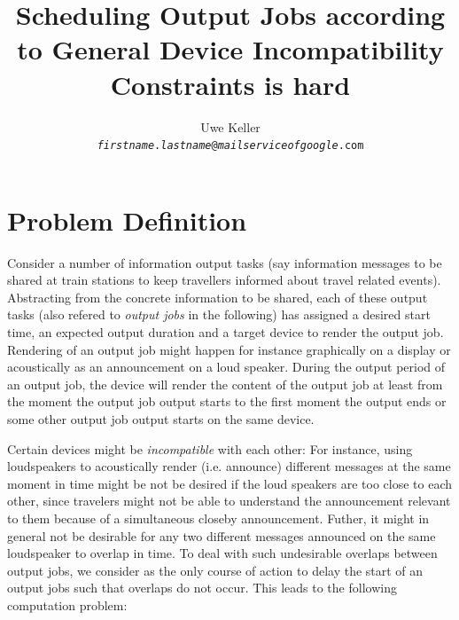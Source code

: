 \documentclass{article}
\title{Scheduling Output Jobs according to General Device Incompatibility Constraints is hard}
\author{Uwe Keller\\{\tt {\em firstname}.{\em lastname}@{\em mailserviceofgoogle}.com}}
\begin{document}
\maketitle


\section{Problem Definition}\label{sec:problem-definition}
Consider a number of information output tasks (say information messages to be shared at train stations to keep travellers informed about travel related events). Abstracting from the concrete information to be shared, each of these output tasks (also refered to {\em output jobs} in the following) has assigned a desired start time, an expected output duration and a target device to render the output job. Rendering of an output job might happen for instance graphically on a display or acoustically as an announcement on a loud speaker. During the output period of an output job, the device will render the content of the output job at least from the moment the output job output starts to the first moment the output ends or some other output job output starts on the same device. 

Certain devices might be {\em incompatible} with each other: For instance, using loudspeakers to acoustically render (i.e. announce) different messages at the same moment in time might be not be desired if the loud speakers are too close to each other, since travelers might not be able to understand the announcement relevant to them because of a simultaneous closeby announcement. Futher, it might in general not be desirable for any two different messages announced on the same loudspeaker to overlap in time.
To deal with such undesirable overlaps between output jobs, we consider as the only course of action to delay the start of an output jobs such that overlaps do not occur. This leads to the following computation problem:
\end{document}
